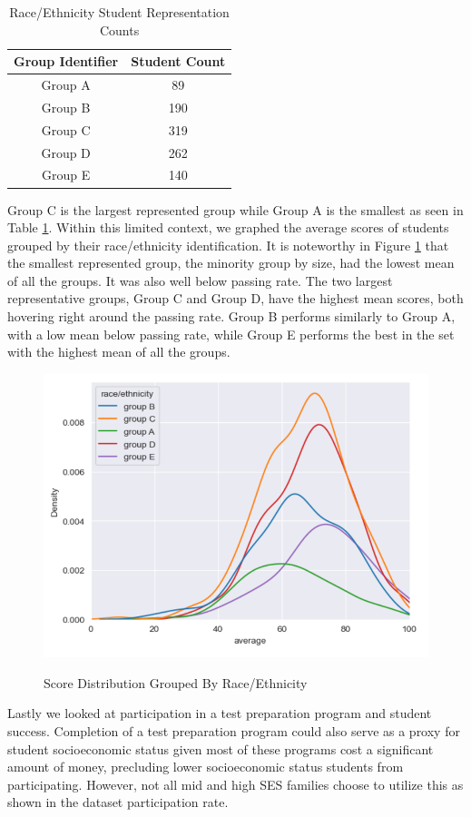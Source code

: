 \documentclass[man,floatsintext]{apa6} %
\begin{document}
\begin{table}[H]
    \centering
    \caption{Race/Ethnicity Student Representation Counts}
    \begin{tabular}{|c|c|}
    \hline
         Group Identifier & Student Count\\
         \hline\hline
         Group A & 89\\
         \hline
         Group B & 190\\
         \hline
         Group C & 319\\
         \hline
         Group D & 262\\
         \hline
         Group E & 140\\
         \hline
    \end{tabular}
    \label{tab:RaceCount}
\end{table}
Group C is the largest represented group while Group A is the smallest as seen in Table \ref{tab:RaceCount}. Within this limited context, we graphed the average scores of students grouped by their race/ethnicity identification. It is noteworthy in Figure \ref{fig:RaceScores} that the smallest represented group, the minority group by size, had the lowest mean of all the groups. It was also well below passing rate.  The two largest representative groups, Group C and Group D, have the highest mean scores, both hovering right around the passing rate. Group B performs similarly to Group A, with a low mean below passing rate, while Group E performs the best in the set with the highest mean of all the groups.
\begin{figure}[H]
    \centering
    \caption{Score Distribution Grouped By Race/Ethnicity}
    \includegraphics[width=0.5\linewidth]{RaceScoreDistribution.png}
    \label{fig:RaceScores}
\end{figure}
Lastly we looked at participation in a test preparation program and student success.  Completion of a test preparation program could also serve as a proxy for student socioeconomic status given most of these programs cost a significant amount of money, precluding lower socioeconomic status students from participating. However, not all mid and high SES families choose to utilize this as shown in the dataset participation rate.
\end{document}
